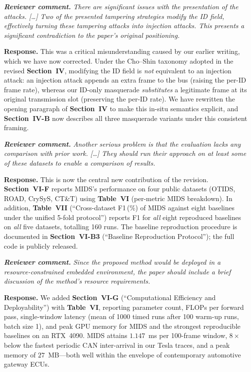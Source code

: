 \documentclass[11pt,a4paper]{article}
\newcommand{\rcomment}[1]{%
  \par\medskip
  \begingroup
  \itshape
  \textbf{Reviewer comment.}\,\,#1
  \endgroup
  \par
}
\newcommand{\rresponse}[1]{%
  \par
  \begingroup
  \color{NavyBlue}
  \textbf{Response.}\,\,#1
  \endgroup
  \par\medskip
}
\newcommand{\xref}[1]{\textbf{#1}}
\begin{document}
\rcomment{There are significant issues with the presentation of
the attacks. [\dots] Two of the presented tampering strategies
modify the ID field, effectively turning these tampering attacks
into injection attacks. This presents a significant contradiction
to the paper's original positioning.}
\rresponse{This was a critical misunderstanding caused by our
earlier writing, which we have now corrected. Under the Cho--Shin
taxonomy adopted in the revised \xref{Section~IV}, modifying the
ID field is \emph{not} equivalent to an injection attack: an
injection attack appends an extra frame to the bus (raising the
per-ID frame rate), whereas our ID-only masquerade
\emph{substitutes} a legitimate frame at its original
transmission slot (preserving the per-ID rate). We have rewritten
the opening paragraph of \xref{Section~IV} to make this in-situ
semantics explicit, and \xref{Section~IV-B} now describes all
three masquerade variants under this consistent framing.}

\rcomment{Another serious problem is that the evaluation lacks any
comparison with prior work. [\dots] They should run their approach
on at least some of these datasets to enable a comparison of
results.}
\rresponse{This is now the central new contribution of the
revision. \xref{Section~VI-F} reports MIDS's performance on four
public datasets (OTIDS, ROAD, CrySyS, CT\&T) using
\xref{Table~VI} (per-metric MIDS breakdown). In addition,
\xref{Table~VII} (``Cross-dataset F1\,(\%) of MIDS against eight
baselines under the unified 5-fold protocol'') reports F1 for
\emph{all} eight reproduced baselines on \emph{all} five datasets,
totalling 160 runs. The baseline reproduction procedure is
documented in \xref{Section~VI-B3} (``Baseline Reproduction
Protocol''); the full code is publicly released.}

\rcomment{Since the proposed method would be deployed in a
resource-constrained embedded environment, the paper should
include a brief discussion of the method's resource requirements.}
\rresponse{We added \xref{Section~VI-G} (``Computational Efficiency
and Deployability'') with \xref{Table~VI}, reporting parameter
count, FLOPs per forward pass, single-window latency (mean of
1000 timed runs after 100 warm-up runs, batch size 1), and peak
GPU memory for MIDS and the strongest reproducible baselines on
an RTX~4090. MIDS attains $1.147$~ms per 100-frame window,
$8\times$ below the fastest periodic CAN inter-arrival in our
Tesla traces, and a peak memory of $27$~MB---both well within the
envelope of contemporary automotive gateway ECUs.}
\end{document}
